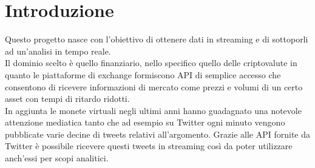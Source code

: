 \section{Introduzione}

Questo progetto nasce con l'obiettivo di ottenere dati in streaming e di sottoporli ad un'analisi
in tempo reale.\\
Il dominio scelto è quello finanziario, nello specifico quello delle criptovalute in quanto le piattaforme di exchange formiscono API di semplice accesso che consentono di ricevere informazioni di mercato come prezzi e volumi di un certo asset con tempi di ritardo ridotti.\\
In aggiunta le monete virtuali negli ultimi anni hanno guadagnato una notevole attenzione mediatica tanto che ad esempio su Twitter ogni minuto vengono pubblicate varie decine di tweets relativi all'argomento. Grazie alle API fornite da Twitter è possibile ricevere questi tweets in streaming così da poter utilizzare anch'essi per scopi analitici.